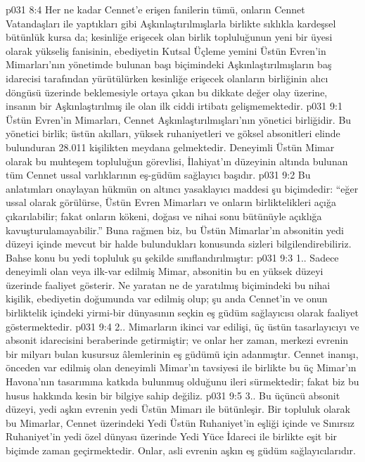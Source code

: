 \vs p031 8:4 Her ne kadar Cennet’e erişen fanilerin tümü, onların Cennet Vatandaşları ile yaptıkları gibi Aşkınlaştırılmışlarla birlikte sıklıkla kardeşsel bütünlük kursa da; kesinliğe erişecek olan birlik topluluğunun yeni bir üyesi olarak yükseliş fanisinin, ebediyetin Kutsal Üçleme yemini Üstün Evren’in Mimarları’nın yönetimde bulunan başı biçimindeki Aşkınlaştırılmışların baş idarecisi tarafından yürütülürken kesinliğe erişecek olanların birliğinin alıcı döngüsü üzerinde beklemesiyle ortaya çıkan bu dikkate değer olay üzerine, insanın bir Aşkınlaştırılmış ile olan ilk ciddi irtibatı gelişmemektedir.
\vs p031 9:1 Üstün Evren’in Mimarları, Cennet Aşkınlaştırılmışları’nın yönetici birliğidir. Bu yönetici birlik; üstün akılları, yüksek ruhaniyetleri ve göksel absonitleri elinde bulunduran 28.011 kişilikten meydana gelmektedir. Deneyimli Üstün Mimar olarak bu muhteşem topluluğun görevlisi, İlahiyat’ın düzeyinin altında bulunan tüm Cennet ussal varlıklarının eş\hyp{}güdüm sağlayıcı başıdır.
\vs p031 9:2 Bu anlatımları onaylayan hükmün on altıncı yasaklayıcı maddesi şu biçimdedir: “eğer ussal olarak görülürse, Üstün Evren Mimarları ve onların birliktelikleri açığa çıkarılabilir; fakat onların kökeni, doğası ve nihai sonu bütünüyle açıklığa kavuşturulamayabilir.” Buna rağmen biz, bu Üstün Mimarlar’ın absonitin yedi düzeyi içinde mevcut bir halde bulundukları konusunda sizleri bilgilendirebiliriz. Bahse konu bu yedi topluluk şu şekilde sınıflandırılmıştır:
\vs p031 9:3 1.\bibnobreakspace {}. Sadece deneyimli olan veya ilk\hyp{}var edilmiş Mimar, absonitin bu en yüksek düzeyi üzerinde faaliyet gösterir. Ne yaratan ne de yaratılmış biçimindeki bu nihai kişilik, ebediyetin doğumunda var edilmiş olup; şu anda Cennet’in ve onun birliktelik içindeki yirmi\hyp{}bir dünyasının seçkin eş güdüm sağlayıcısı olarak faaliyet göstermektedir.
\vs p031 9:4 2.\bibnobreakspace {}. Mimarların ikinci var edilişi, üç üstün tasarlayıcıyı ve absonit idarecisini beraberinde getirmiştir; ve onlar her zaman, merkezi evrenin bir milyarı bulan kusursuz âlemlerinin eş güdümü için adanmıştır. Cennet inanışı, önceden var edilmiş olan deneyimli Mimar’ın tavsiyesi ile birlikte bu üç Mimar’ın Havona’nın tasarımına katkıda bulunmuş olduğunu ileri sürmektedir; fakat biz bu husus hakkında kesin bir bilgiye sahip değiliz.
\vs p031 9:5 3.\bibnobreakspace {}. Bu üçüncü absonit düzeyi, yedi aşkın evrenin yedi Üstün Mimarı ile bütünleşir. Bir topluluk olarak bu Mimarlar, Cennet üzerindeki Yedi Üstün Ruhaniyet’in eşliği içinde ve Sınırsız Ruhaniyet’in yedi özel dünyası üzerinde Yedi Yüce İdareci ile birlikte eşit bir biçimde zaman geçirmektedir. Onlar, asli evrenin aşkın eş güdüm sağlayıcılarıdır.
